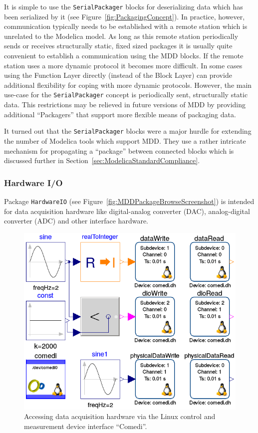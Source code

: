 \documentclass{resources/modelica}
\newcommand{\modelica}[1]{\lstinline[language=modelica]|#1|}
\begin{document}
It is simple to use the
\modelica{SerialPackager} blocks for deserializing data which has been serialized by it
(see Figure~\ref{fig:PackagingConcept}). In practice, however, communication
typically needs to be established with a remote station which is unrelated to
the Modelica model. As long as this remote station periodically sends or
receives structurally static, fixed sized packages it is usually quite
convenient to establish a communication using the MDD blocks. If the remote
station uses a more dynamic protocol it becomes more difficult. In some cases
using the \textsf{Function Layer} directly (instead of the \textsf{Block Layer})
can provide additional flexibility for coping with more dynamic protocols.
However, the main use-case for the \modelica{SerialPackager} concept is periodically
sent, structurally static data. This restrictions may be relieved in
future versions of MDD by providing additional ``Packagers'' that support more
flexible means of packaging data.

It turned out that the \modelica{SerialPackager} blocks were a major hurdle for
extending the number of Modelica tools which support MDD. They use a rather
intricate mechanism for propagating a ``package'' between connected blocks
which is discussed further in Section~\ref{sec:ModelicaStandardCompliance}.

\subsubsection{Hardware I/O}

Package \modelica{HardwareIO} (see
Figure~\ref{fig:MDDPackageBrowseScreenshot}) is intended for data acquisition
hardware like digital-analog converter (DAC), analog-digital converter (ADC) and
other interface hardware.

\begin{figure}[htb]
  \centering
  \includegraphics[width=0.9\columnwidth]{figures/MDDComedi}
  \caption{Accessing data acquisition hardware via the Linux
  control and measurement device interface ``Comedi''.}
  \label{fig:MDDComedi}
\end{figure}
\end{document}

